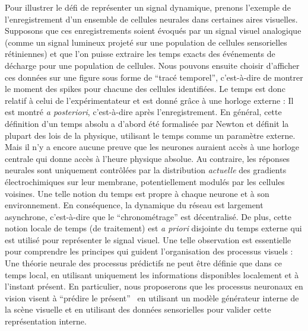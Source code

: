 Pour illustrer le défi de représenter un signal dynamique, prenons
l'exemple de l'enregistrement d'un ensemble de cellules neurales dans
certaines aires visuelles. Supposons que ces enregistrements soient
évoqués par un signal visuel analogique (comme un signal lumineux
projeté sur une population de cellules sensorielles rétiniennes) et que
l'on puisse extraire les temps exacts des événements de décharge
pour une population de cellules. Nous pouvons ensuite choisir d'afficher
ces données sur une figure sous forme de ``tracé temporel'', c'est-à-dire de montrer le moment
des spikes pour chacune des cellules identifiées. Le temps est donc
relatif à celui de l'expérimentateur et est donné grâce à une horloge
externe : Il est montré \emph{a posteriori}, c'est-à-dire après
l'enregistrement. En général, cette définition d'un temps absolu a
d'abord été formalisée par Newton et définit la plupart des lois de la
physique, utilisant le temps comme un paramètre externe. Mais il n'y a
encore aucune preuve que les neurones auraient accès à une horloge
centrale qui donne accès à l'heure physique absolue. Au
contraire, les réponses neurales sont uniquement contrôlées par la
distribution \emph{actuelle} des gradients électrochimiques sur leur
membrane, potentiellement modulés par les cellules voisines. Une telle
notion du temps est propre à chaque neurone et à son environnement. En
conséquence, la dynamique du réseau est largement asynchrone,
c'est-à-dire que le ``chronométrage'' est décentralisé. De plus, cette
notion locale de temps (de traitement) est \emph{a priori} disjointe du
temps externe qui est utilisé pour représenter le signal visuel. Une
telle observation est essentielle pour comprendre les principes qui
guident l'organisation des processus visuels : Une théorie neurale des
processus prédictifs ne peut être définie que dans ce temps local, en utilisant uniquement les informations disponibles
localement et à l'instant présent. En particulier, nous proposerons que les
processus neuronaux en vision visent à ``prédire le présent''~\citep{Changizi08} en utilisant un modèle générateur interne de la scène visuelle
et en utilisant des données sensorielles pour valider cette
représentation interne.

